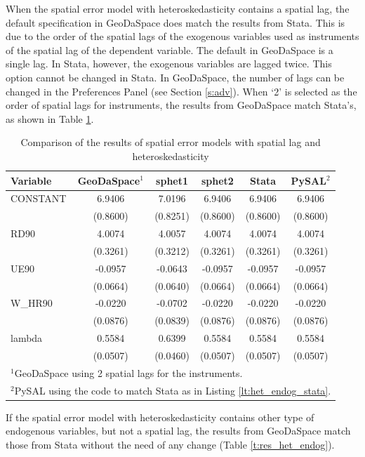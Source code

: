 \documentclass{article}
\begin{document}
When the spatial error model with heteroskedasticity contains a spatial lag, the default specification in GeoDaSpace does match the results from Stata. This is due to the order of the spatial lags of the exogenous variables used as instruments of the spatial lag of the dependent variable. The default in GeoDaSpace is a single lag. In Stata, however, the exogenous variables are lagged twice. This option cannot be changed in Stata. In GeoDaSpace, the number of lags can be changed in the Preferences Panel (see Section \ref{s:adv}). When `2' is selected as the order of spatial lags for instruments, the results from GeoDaSpace match Stata's, as shown in Table \ref{t:res_het_combo}. 
\begin{table}[htpb]
\caption{Comparison of the results of spatial error models with spatial lag and heteroskedasticity}
\label{t:res_het_combo}
\centering
\begin{small}
\begin{tabular}{l|ccccc} \hline
\textbf{Variable}&\textbf{GeoDaSpace$^1$}&\textbf{sphet1}&\textbf{sphet2}&\textbf{Stata}&\textbf{PySAL$^2$}\\ \hline
CONSTANT&6.9406&7.0196&6.9406&6.9406&6.9406\\
&(0.8600)&(0.8251)&(0.8600)&(0.8600)&(0.8600)\\
RD90&4.0074&4.0057&4.0074&4.0074&4.0074\\
&(0.3261)&(0.3212)&(0.3261)&(0.3261)&(0.3261)\\
UE90&-0.0957&-0.0643&-0.0957&-0.0957&-0.0957\\
&(0.0664)&(0.0640)&(0.0664)&(0.0664)&(0.0664)\\
W\_HR90&-0.0220&-0.0702&-0.0220&-0.0220&-0.0220\\
&(0.0876)&(0.0839)&(0.0876)&(0.0876)&(0.0876)\\
lambda&0.5584&0.6399&0.5584&0.5584&0.5584\\
&(0.0507)&(0.0460)&(0.0507)&(0.0507)&(0.0507)\\
\hline
\multicolumn{6}{l}{\scriptsize{$^1$GeoDaSpace using 2 spatial lags for the instruments.}} \\
\multicolumn{6}{l}{\scriptsize{$^2$PySAL using the code to match Stata as in Listing \ref{lt:het_endog_stata}.}} \\
\end{tabular}
\end{small}
\end{table}

If the spatial error model with heteroskedasticity contains other type of endogenous variables, but not a spatial lag, the results from GeoDaSpace match those from Stata without the need of any change (Table \ref{t:res_het_endog}).
\end{document}
